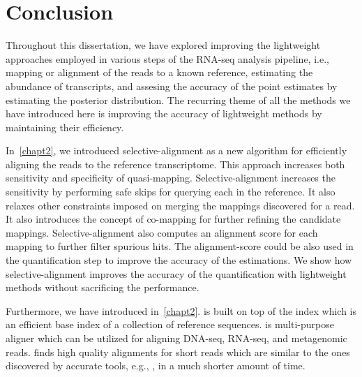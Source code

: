 
\renewcommand{\thechapter}{5}

\chapter[Conclusion]{Conclusion} 
\label{conclusion}

Throughout this dissertation, we have explored improving the lightweight approaches
employed in various steps of the RNA-seq analysis pipeline, i.e., mapping or alignment
of the reads to a known reference, estimating the abundance of transcripts, and 
assesing the accuracy of the point estimates by estimating the posterior distribution.
The recurring theme of all the methods we have introduced here is improving the accuracy
of lightweight methods by maintaining their efficiency.

In~\cref{chapt2}, we introduced selective-alignment as a new algorithm for efficiently
aligning the reads to the reference transcriptome. This approach increases both sensitivity
and specificity of quasi-mapping. Selective-alignment increases the sensitivity by performing
safe skips for querying each \kmer in the reference. It also relaxes other constraints
imposed on merging the mappings discovered for a read. It also introduces the concept of 
co-mapping for further refining the candidate mappings. Selective-alignment also computes
an alignment score for each mapping to further filter spurious hits. The alignment-score
could be also used in the quantification step to improve the accuracy of the estimations.
We show how selective-alignment improves the accuracy of the quantification with lightweight
methods without sacrificing the performance.

Furthermore, we have introduced \puffaligner in~\cref{chapt2}. \puffaligner is built on top
of the \pufferfish index which is an efficient \ccdbg base index of a collection of reference
sequences. \puffaligner is multi-purpose aligner which can be utilized for aligning DNA-seq, 
RNA-seq, and metagenomic reads. \puffaligner finds high quality alignments for short reads 
which are similar to the ones discovered by accurate tools, e.g., \bt, in a much shorter amount
of time.

